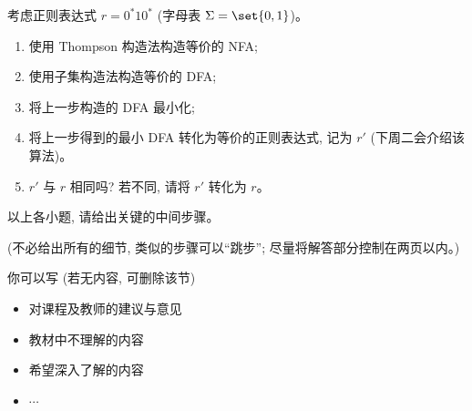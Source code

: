 \documentclass[a4paper, justified]{tufte-handout}
\begin{document}
\begin{problem}[正则表达式与自动机 \score{10 = 2 + 2 + 2 + 2 + 2}]
  考虑正则表达式 $r = 0^{\ast}10^{\ast}$ (字母表 $\Sigma = \set{0, 1}$)。
  \begin{enumerate}[(1)]
    \item 使用 Thompson 构造法构造等价的 NFA;
    \item 使用子集构造法构造等价的 DFA;
    \item 将上一步构造的 DFA 最小化;
    \item 将上一步得到的最小 DFA 转化为等价的正则表达式, 记为 $r'$ (下周二会介绍该算法)。
    \item $r'$ 与 $r$ 相同吗? 若不同, 请将 $r'$ 转化为 $r$。
  \end{enumerate}
  以上各小题, 请给出关键的中间步骤。

  \noindent (不必给出所有的细节, 类似的步骤可以``跳步''; 尽量将解答部分控制在两页以内。)

\end{problem}

\begin{solution}
\end{solution}



\beginfb

你可以写 (若无内容, 可删除该节)
\begin{itemize}
  \item 对课程及教师的建议与意见
  \item 教材中不理解的内容
  \item 希望深入了解的内容
  \item $\cdots$
\end{itemize}
\end{document}
